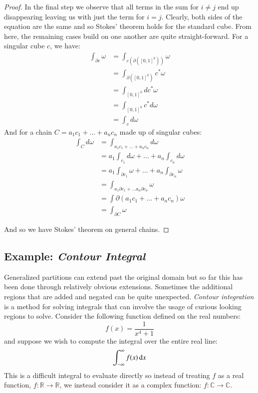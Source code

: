 \begin{proof}
In the final step we observe that all terms in the sum for $i \neq j$ end up disappearing leaving us with just the term for
$i=j$.
Clearly, both sides of the equation are the same and so Stokes' theorem holds for the standard cube.
From here, the remaining cases build on one another are quite straight-forward.
For a singular cube $c$, we have:
\begin{align*}
	\int_{\partial c} \omega
		&= \int_{c (\partial ([0,1]^k))} \omega \\
		&= \int_{\partial( [0,1]^k)} c^* \omega \\
		&= \int_{[0,1]^k} dc^* \omega \\
		&= \int_{[0,1]^k} c^* d \omega \\
		&= \int_c d\omega
\end{align*}
And for a chain $C=a_1 c_1 + \ldots + a_n c_n$ made up of singular cubes:
\begin{align*}
	\int_C d\omega 
		&= \int_{a_1c_1 + \ldots + a_nc_n	} d\omega \\
		&= a_1 \int_{c_1} d\omega + \ldots + a_n \int_{c_n} d\omega \\
		&= a_1 \int_{\partial c_1} \omega + \ldots + a_n \int_{\partial c_n} \omega \\
		&= \int_{a_1 \partial c_1 + \ldots a_n \partial c_n} \omega \\
		&= \int{\partial ( a_1c_1 + \ldots + a_n c_n)} \omega \\
		&= \int_{\partial C} \omega
\end{align*}

And so we have Stokes' theorem on general chains.
\end{proof}


\subsection{Example: \emph{Contour Integral}}


Generalized partitions can extend past the original domain but so far this has been done through relatively
obvious extensions.
Sometimes the additional regions that are added and negated can be quite unexpected.
\emph{Contour integration} is a method for solving integrals that can involve the usage of curious looking regions to solve.
Consider the following function defined on the real numbers:
\begin{equation}
	f(x) = \frac{1}{x^4 + 1}
\end{equation}
and suppose we wish to compute the integral over the entire real line:
\begin{equation}
	 \int_{-\infty}^\infty f(x) \mathop{}\!\mathrm{d} x
\end{equation}
This is a difficult integral to evaluate directly so instead of treating $f$ as a real function, $f:\mathbb{R} \to \mathbb{R}$, 
we instead consider it as a complex function: $f:\mathbb{C} \to \mathbb{C}$.


